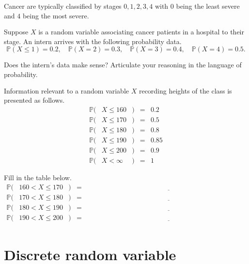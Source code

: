 \documentclass[../main.tex]{subfiles}
\begin{document}
\begin{example}
  Cancer are typically classified by stages \(0,1,2,3,4\) with \(0\) being the least severe and \(4\) being the most severe. 

  Suppose \(X\) is a random variable associating cancer patients in a hospital to their stage. An intern arrives with the following probability data. 
  \[
    \mathbb{P}(X \le 1) = 0.2, \quad
    \mathbb{P}(X = 2) = 0.3, \quad
    \mathbb{P}(X = 3) = 0.4, \quad
    \mathbb{P}(X = 4) = 0.5.
  \]

  Does the intern's data make sense? Articulate your reasoning in the language of probability.
\end{example}

\begin{example}
  Information relevant to a random variable \(X\) recording heights of the class is presented as follows.  
  \[
    \begin{array}{rclcl}
      \mathbb{P}(&X \le 160  &) &=& 0.2  \\
      \mathbb{P}(&X \le 170  &) &=& 0.5  \\
      \mathbb{P}(&X \le 180  &) &=& 0.8  \\
      \mathbb{P}(&X \le 190  &) &=& 0.85 \\
      \mathbb{P}(&X \le 200  &) &=& 0.9  \\
      \mathbb{P}(&X < \infty &) &=& 1 
    \end{array}
  \]

  Fill in the table below. 
    \[
      \begin{array}{rclcl}
        \mathbb{P}(&160 < X \le 170 &) &=& \underline{\hspace{4in}}  \\[2ex]
        \mathbb{P}(&170 < X \le 180 &) &=& \underline{\hspace{4in}}  \\[2ex]
        \mathbb{P}(&180 < X \le 190 &) &=& \underline{\hspace{4in}}  \\[2ex]
        \mathbb{P}(&190 < X \le 200 &) &=& \underline{\hspace{4in}}  \\[2ex]
      \end{array}
    \]
\end{example}
\clearpage

\section{Discrete random variable}
\end{document}

